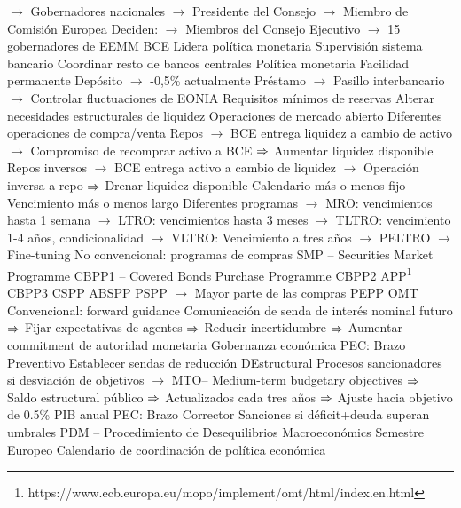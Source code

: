 \documentclass{nuevotema}
\begin{document}
\begin{esquemal}
				\4[] $\to$ Gobernadores nacionales
				\4[] $\to$ Presidente del Consejo
				\4[] $\to$ Miembro de Comisión Europea
				\4[] Deciden:
				\4[] $\to$ Miembros del Consejo Ejecutivo
				\4[] $\to$ 15 gobernadores de EEMM
				\4 BCE
				\4[] Lidera política monetaria
				\4[] Supervisión sistema bancario
				\4[] Coordinar resto de bancos centrales
			\3 Política monetaria
				\4 Facilidad permanente
				\4[] Depósito
				\4[] $\to$ -0,5\% actualmente
				\4[] Préstamo
				\4[] $\to$ Pasillo interbancario
				\4[] $\to$ Controlar fluctuaciones de EONIA
				\4 Requisitos mínimos de reservas
				\4[] Alterar necesidades estructurales de liquidez
				\4 Operaciones de mercado abierto
				\4[] Diferentes operaciones de compra/venta
				\4[] Repos
				\4[] $\to$ BCE entrega liquidez a cambio de activo
				\4[] $\to$ Compromiso de recomprar activo a BCE
				\4[] $\Rightarrow$ Aumentar liquidez disponible
				\4[] Repos inversos
				\4[] $\to$ BCE entrega activo a cambio de liquidez
				\4[] $\to$ Operación inversa a repo
				\4[] $\Rightarrow$ Drenar liquidez disponible
				\4[] Calendario más o menos fijo
				\4[] Vencimiento más o menos largo
				\4[] Diferentes programas
				\4[] $\to$ MRO: vencimientos hasta 1 semana
				\4[] $\to$ LTRO: vencimientos hasta 3 meses
				\4[] $\to$ TLTRO: vencimiento 1-4 años, condicionalidad
				\4[] $\to$ VLTRO: Vencimiento a tres años
				\4[] $\to$ PELTRO
				\4[] $\to$ Fine-tuning
				\4 No convencional: programas de compras
				\4[] SMP -- Securities Market Programme
				\4[] CBPP1 -- Covered Bonds Purchase Programme
				\4[] CBPP2
				\4[] \underline{APP}\footnote{https://www.ecb.europa.eu/mopo/implement/omt/html/index.en.html}
				\4[] CBPP3
				\4[] CSPP
				\4[] ABSPP
				\4[] PSPP $\to$ Mayor parte de las compras
				\4[] PEPP
				\4[] OMT
				\4 Convencional: forward guidance
				\4[] Comunicación de senda de interés nominal futuro
				\4[] $\Rightarrow$ Fijar expectativas de agentes
				\4[] $\Rightarrow$ Reducir incertidumbre
				\4[] $\Rightarrow$ Aumentar commitment de autoridad monetaria
			\3 Gobernanza económica
				\4 PEC: Brazo Preventivo
				\4[] Establecer sendas de reducción DEstructural
				\4[] Procesos sancionadores si desviación de objetivos
				\4[] $\to$ MTO-- Medium-term budgetary objectives
				\4[] $\Rightarrow$ Saldo estructural público
				\4[] $\Rightarrow$ Actualizados cada tres años
				\4[] $\Rightarrow$ Ajuste hacia objetivo de 0.5\% PIB anual
				\4 PEC: Brazo Corrector
				\4[] Sanciones si déficit+deuda superan umbrales
				\4 PDM -- Procedimiento de Desequilibrios Macroeconómics
				\4 Semestre Europeo
				\4[] Calendario de coordinación de política económica

\end{esquemal}
\end{document}
